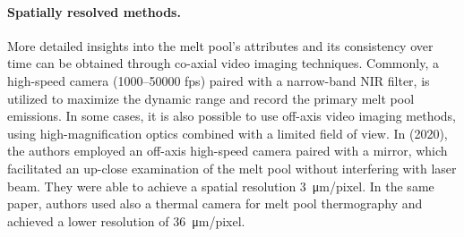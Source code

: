 \paragraph{Spatially resolved methods.} More detailed insights into the melt pool's attributes and its consistency over time can be obtained through co-axial video imaging techniques. Commonly, a high-speed camera (\numrange{1000}{50000} \unit{fps}) paired with a narrow-band NIR filter, is utilized to maximize the dynamic range and record the primary melt pool emissions. In some cases, it is also possible to use off-axis video imaging methods, using high-magnification optics combined with a limited field of view. In \citeauthor{lane_measurements_2020} (2020), the authors employed an off-axis high-speed camera paired with a mirror, which facilitated an up-close examination of the melt pool without interfering with laser beam. They were able to achieve a spatial resolution \SI{3}{\micro\metre / pixel}. In the same paper, authors used also a thermal camera for melt pool thermography and achieved a lower resolution of \SI{36}{\micro \metre / pixel}.
